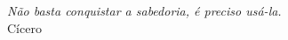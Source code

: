 
\chapter*{}
\vspace{15cm}
\begin{flushright}
	\textit
	{
		Não basta conquistar a sabedoria, é preciso usá-la.
	}\medskip\\ 
	Cícero
\end{flushright}
